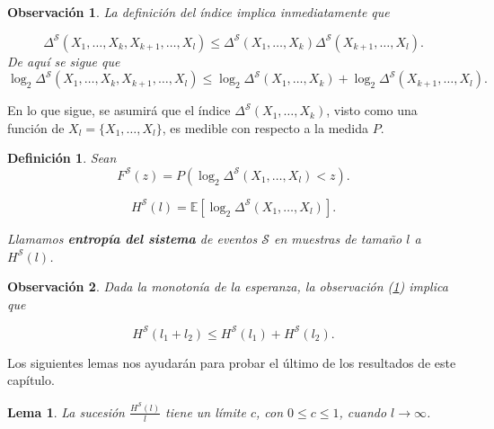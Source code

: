 \documentclass{report}
\newtheorem{lem}{Lema}[subsection]
\newtheorem{dfn}{Definición}[subsection]
\newtheorem{obs}{Observación}[subsection]
\begin{document}
\begin{obs}\label{obs:desigualdad triangular indice de un sistema}
    La definición del índice implica inmediatamente que  

    \begin{equation*}
    \Delta^{\mathcal{S}}(X_1, \dots, X_{k}, X_{k+1}, \dots,X_l) \leq \Delta^{\mathcal{S}}(X_1, \dots, X_k) \Delta^{\mathcal{S}}(X_{k+1}, \dots, X_l).
    \end{equation*}
    De aquí se sigue que  
    \begin{equation*}
    \log_2 \Delta^{\mathcal{S}}(X_1, \dots, X_{k}, X_{k+1}, \dots,X_l) \leq \log_2 \Delta^{\mathcal{S}}(X_1, \dots, X_k) + \log_2 \Delta^{\mathcal{S}}(X_{k+1}, \dots, X_l).
    \end{equation*}\newline
\end{obs}


En lo que sigue, se asumirá que el índice \( \Delta^{\mathcal{S}}(X_1, \dots, X_k) \), visto como una función de 
\( X_l = \{X_1, \dots, X_l\} \), es medible con respecto a la medida \( P \).\newline

\begin{dfn}
    Sean  
    \[
    F^{\mathcal{S}}(z) = P\left(\log_2 \Delta^{\mathcal{S}}(X_1, \dots, X_l) < z \right).
    \]
     
    \[
    H^{\mathcal{S}}(l) = \mathbb{E} \left[ \log_2 \Delta^{\mathcal{S}}(X_1, \dots, X_l) \right].
    \]\newline

    Llamamos \textbf{entropía del sistema} de eventos \( \mathcal{S} \) en muestras de tamaño \( l \) a  $H^{\mathcal{S}}(l)$.\newline

\end{dfn}

\begin{obs}
    Dada la monotonía de la esperanza, la observación (\ref{obs:desigualdad triangular indice de un sistema}) implica que  
    
    \[
        H^{\mathcal{S}}(l_1 + l_2) \leq H^{\mathcal{S}}(l_1) + H^{\mathcal{S}}(l_2).
    \]\newline
\end{obs}

Los siguientes lemas nos ayudarán para probar el último de los resultados de este capítulo.\newline

\begin{lem}\label{lema 3}
    La sucesión \( \frac{H^{\mathcal{S}}(l)}{l} \) tiene un límite \( c \), con \( 0 \leq c \leq 1 \), cuando \( l \to \infty \).
\end{lem}
    
\end{document}
